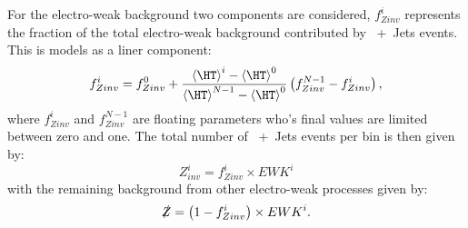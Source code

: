 For the electro-weak background two components are considered, $f^{i}_{Zinv}$ represents the fraction of the total electro-weak background contributed by \HepProcess{\PZ\to\Pnu\Pnu}~+~Jets events. This is models as a liner component:
\begin{equation}
  f^{i}_{Zinv} = f^{0}_{Zinv}+\frac{\left<\HT\right>^{i}-\left<\HT\right>^{0}}{\left<\HT\right>^{N-1}-\left<\HT\right>^{0}}\left(f^{N-1}_{Zinv}-f^{i}_{Zinv}\right),
\end{equation}
where $f^{i}_{Zinv}$ and $f^{N-1}_{Zinv}$ are floating parameters who's final values are limited between zero and one. The total number of \HepProcess{\PZ\to\Pnu\Pnu}~+~Jets events per bin is then given by:
\begin{equation}
  Z^{i}_{inv} = f^{i}_{Zinv} \times EWK^{i}
\end{equation}
with the remaining background from other electro-weak processes given by:
\begin{equation}
  \slashed{Z}=\left(1-f^{i}_{Zinv}\right)\times EWK^{i}.
\end{equation}

